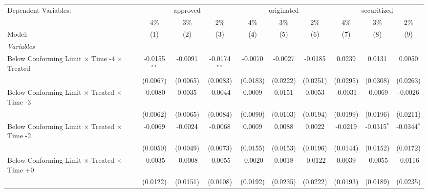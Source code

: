 \begingroup
\centering
\begin{tabular}{lccccccccc}
   \tabularnewline \midrule \midrule
   Dependent Variables: & \multicolumn{3}{c}{approved} & \multicolumn{3}{c}{originated} & \multicolumn{3}{c}{securitized}\\
                                                              & 4\%            & 3\%            & 2\%            & 4\%      & 3\%           & 2\%          & 4\%       & 3\%           & 2\% \\    
   Model:                                                     & (1)            & (2)            & (3)            & (4)      & (5)           & (6)          & (7)       & (8)           & (9)\\  
   \midrule
   \emph{Variables}\\
   Below Conforming Limit $\times$ Time -4 $\times$ Treated   & -0.0155$^{**}$ & -0.0091        & -0.0174$^{**}$ & -0.0070  & -0.0027       & -0.0185      & 0.0239    & 0.0131        & 0.0050\\   
                                                              & (0.0067)       & (0.0065)       & (0.0083)       & (0.0183) & (0.0222)      & (0.0251)     & (0.0295)  & (0.0308)      & (0.0263)\\   
   Below Conforming Limit $\times$ Treated $\times$ Time -3   & -0.0080        & 0.0035         & -0.0044        & 0.0009   & 0.0151        & 0.0053       & -0.0031   & -0.0069       & -0.0026\\   
                                                              & (0.0062)       & (0.0065)       & (0.0084)       & (0.0090) & (0.0103)      & (0.0194)     & (0.0199)  & (0.0196)      & (0.0211)\\   
   Below Conforming Limit $\times$ Treated $\times$ Time -2   & -0.0069        & -0.0024        & -0.0068        & 0.0009   & 0.0088        & 0.0022       & -0.0219   & -0.0315$^{*}$ & -0.0344$^{*}$\\   
                                                              & (0.0050)       & (0.0049)       & (0.0073)       & (0.0155) & (0.0153)      & (0.0196)     & (0.0144)  & (0.0152)      & (0.0172)\\   
   Below Conforming Limit $\times$ Treated $\times$ Time +0   & -0.0035        & -0.0008        & -0.0055        & -0.0020  & 0.0018        & -0.0122      & 0.0039    & -0.0055       & -0.0116\\   
                                                              & (0.0122)       & (0.0151)       & (0.0108)       & (0.0192) & (0.0235)      & (0.0222)     & (0.0193)  & (0.0189)      & (0.0235)\\   

\end{tabular}
